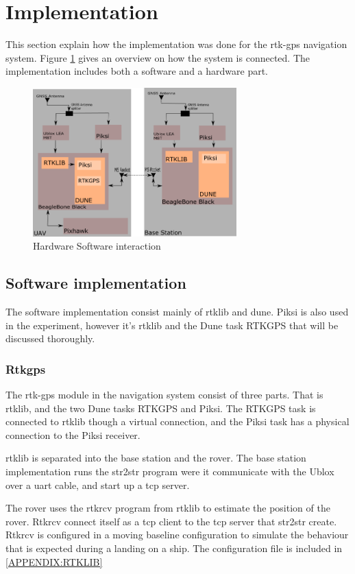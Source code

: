 \section{Implementation}
This section explain how the implementation was done for the \gls{rtk-gps} navigation system. Figure \ref{figure:HardSoft} gives an overview on how the system is connected. The implementation includes both a software and a hardware part. 

\begin{figure}[H]
	\centering
		\includegraphics[width=0.7\textwidth]{figs/HardwareSoftware.png}
		\caption{Hardware Software interaction}
		\label{figure:HardSoft}
\end{figure}
\subsection{Software implementation}
The software implementation consist mainly of \gls{rtklib} and dune. Piksi is also used in the experiment, however it's \gls{rtklib} and the Dune task RTKGPS that will be discussed thoroughly.
\subsubsection{Rtkgps}
The \gls{rtk-gps} module in the navigation system consist of three parts. That is \gls{rtklib}, and the two Dune tasks RTKGPS and Piksi. The RTKGPS task is connected to \gls{rtklib} though a virtual connection, and the Piksi task has a physical connection to the Piksi receiver.


\gls{rtklib} is separated into the base station and the rover. The base station implementation runs the  str2str program were it communicate with the Ublox over a uart cable, and start up a tcp server.

The rover uses the rtkrcv program from \gls{rtklib} to estimate the position of the rover. Rtkrcv connect itself as a tcp client to the tcp server that str2str create. Rtkrcv is configured in a moving baseline configuration to simulate the behaviour that is expected during a landing on a ship. The configuration file is included in \ref{APPENDIX:RTKLIB}

